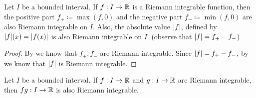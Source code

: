 \begin{cor}\label{i:11.4.4}
  \quad
  Let \(I\) be a bounded interval.
  If \(f : I \to \mathbb{R}\) is a Riemann integrable function, then the positive part \(f_+ \coloneqq \max(f, 0)\) and the negative part \(f_- \coloneqq \min(f, 0)\) are also Riemann integrable on \(I\).
  Also, the absolute value \(\left\lvert f\right\rvert\), defined by \(\abs{f}(x) = \abs{f(x)}\) is also Riemann integrable on \(I\).
  (observe that \(\left\lvert f\right\rvert = f_+ - f_-\))
\end{cor}

\begin{proof}
  By  we know that \(f_+, f_-\) are Riemann integrable.
  Since \(\left\lvert f\right\rvert = f_+ - f_-\), by  we know that \(\left\lvert f\right\rvert\) is Riemann integrable.
\end{proof}

\begin{thm}\label{i:11.4.5}
  Let \(I\) be a bounded interval.
  If \(f : I \to \mathbb{R}\) and \(g : I \to \mathbb{R}\) are Riemann integrable, then \(fg : I \to \mathbb{R}\) is also Riemann integrable.
\end{thm}

